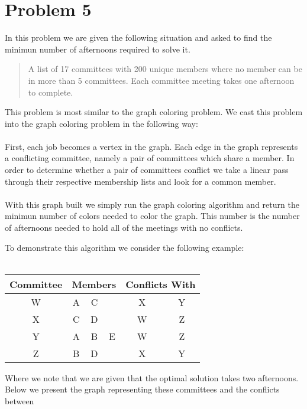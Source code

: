 \section*{Problem 5}

In this problem we are given the following situation and asked to find the 
minimun number of afternoons required to solve it.

\begin{quote}
    A list of 17 committees with 200 unique members where no member can be in more
    than 5 committees. Each committee meeting takes one afternoon to complete.
\end{quote}
%
This problem is most similar to the graph coloring problem. We cast this problem
into the graph coloring problem in the following way:
\\
\\
First, each job becomes a vertex in the graph. Each edge in the graph represents a
conflicting committee, namely a pair of committees which share a member. In order 
to determine whether a pair of committees conflict we take a linear pass through 
their respective membership lists and look for a common member.
\\
\\
With this graph built we simply run the graph coloring algorithm and return the 
minimun number of colors needed to color the graph. This number is the number of 
afternoons needed to hold all of the meetings with no conflicts.
\begin{center}
To demonstrate this algorithm we consider the following example: 
\\\hfill
\\
    \begin{tabular}{| c | c  c  c| c c | }
        \hline
        \textbf{Committee} & \multicolumn{3}{l|}{\textbf{Members}} & 
        \multicolumn{2}{l|}{\textbf{Conflicts With}} \\
        \hline
        W & A & C & & X & Y \\
        \hline
        X & C & D & & W & Z \\
        \hline
        Y & A & B &E& W & Z \\
        \hline
        Z & B & D & & X & Y \\
        \hline
    \end{tabular}
\end{center}
%
Where we note that we are given that the optimal solution takes two afternoons. 
Below we present the graph representing these committees and the conflicts between
